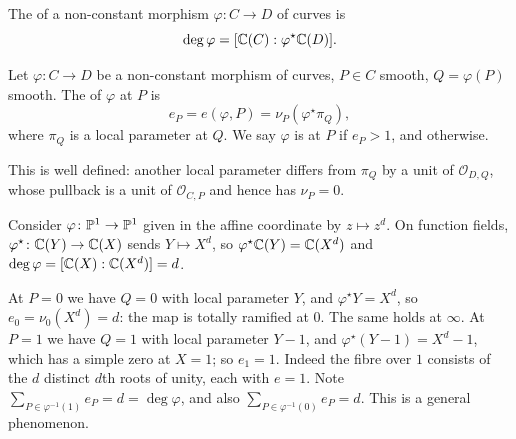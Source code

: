 \documentclass[a4paper]{scrartcl}
\newcommand{\Oh}{\mathcal{O}}
\begin{document}
\begin{definition}[Degree]
	The  of a non-constant morphism $\varphi \colon C \to D$ of curves is
	$$\deg\varphi = [\mathbb{C}(C) : \varphi^\star\mathbb{C}(D)].$$
\end{definition}

\begin{definition}[Ramification]
	Let $\varphi \colon C \to D$ be a non-constant morphism of curves, $P \in C$ smooth, $Q = \varphi(P)$ smooth. The  of $\varphi$ at $P$ is
	$$e_P = e(\varphi,P) = \nu_P(\varphi^\star\pi_Q),$$
	where $\pi_Q$ is a local parameter at $Q$. We say $\varphi$ is  at $P$ if $e_P > 1$, and  otherwise.
\end{definition}

This is well defined: another local parameter differs from $\pi_Q$ by a unit of $\Oh_{D,Q}$, whose pullback is a unit of $\Oh_{C,P}$ and hence has $\nu_P = 0$.

\begin{example}\label{ex:zd}
	Consider $\varphi \colon \mathbb{P}^1\to\mathbb{P}^1$ given in the affine coordinate by $z \mapsto z^d$. On function fields, $\varphi^\star \colon \mathbb{C}(Y) \to \mathbb{C}(X)$ sends $Y \mapsto X^d$, so $\varphi^\star\mathbb{C}(Y) = \mathbb{C}(X^d)$ and $\deg\varphi = [\mathbb{C}(X):\mathbb{C}(X^d)] = d$.

	At $P = 0$ we have $Q = 0$ with local parameter $Y$, and $\varphi^\star Y = X^d$, so $e_0 = \nu_0(X^d) = d$: the map is totally ramified at $0$. The same holds at $\infty$. At $P = 1$ we have $Q = 1$ with local parameter $Y-1$, and $\varphi^\star(Y-1) = X^d - 1$, which has a simple zero at $X = 1$; so $e_1 = 1$. Indeed the fibre over $1$ consists of the $d$ distinct $d$th roots of unity, each with $e = 1$. Note $\sum_{P \in \varphi^{-1}(1)} e_P = d = \deg\varphi$, and also $\sum_{P\in\varphi^{-1}(0)}e_P = d$. This is a general phenomenon.
\end{example}
\end{document}
